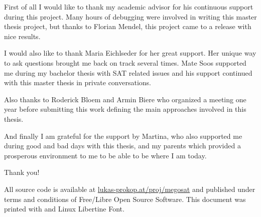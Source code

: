 \documentclass[11pt,a4paper,final,openright]{book}
\theoremstyle{definition}
\begin{document}
\begin{acknowledgements}%
  \parskip5pt
  First of all I would like to thank my academic advisor for his continuous support
  during this project. Many hours of debugging were involved in writing this
  master thesis project, but thanks to Florian Mendel, this project came to a release
  with nice results.

  I would also like to thank Maria Eichlseder for her great support. Her unique
  way to ask questions brought me back on track several times.
  Mate Soos supported me during my bachelor thesis with SAT related issues
  and his support continued with this master thesis in private conversations.

  Also thanks to Roderick Bloem and Armin Biere who organized a meeting
  one year before submitting this work defining the main approaches involved
  in this thesis.

  And finally I am grateful for the support by Martina,
  who also supported me during good and bad days with this thesis,
  and my parents which provided a prosperous environment to me
  to be able to be where I am today.

  Thank you!
\end{acknowledgements}

All source code is available at \href{http://lukas-prokop.at/proj/megosat}{lukas-prokop.at/proj/megosat}
and published under terms and conditions of Free/Libre Open Source Software.
This document was printed with \LuaLaTeX and Linux Libertine Font.


\listoffigures
\listoftables
\tableofcontents
\mainmatter







\printindex
\printbibliography
\end{document}
